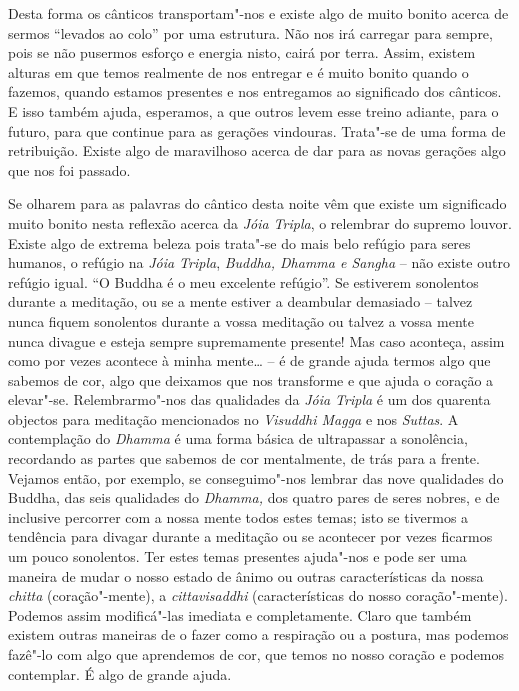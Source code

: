 Desta forma os cânticos transportam"-nos e existe algo de muito bonito
acerca de sermos ``levados ao colo'' por uma estrutura. Não nos irá
carregar para sempre, pois se não pusermos esforço e energia nisto,
cairá por terra. Assim, existem alturas em que temos realmente de nos
entregar e é muito bonito quando o fazemos, quando estamos presentes e
nos entregamos ao significado dos cânticos. E isso também ajuda,
esperamos, a que outros levem esse treino adiante, para o futuro, para
que continue para as gerações vindouras. Trata"-se de uma forma de
retribuição. Existe algo de maravilhoso acerca de dar para as novas
gerações algo que nos foi passado.

Se olharem para as palavras do cântico desta noite vêm que existe um
significado muito bonito nesta reflexão acerca da \emph{Jóia Tripla}, o
relembrar do supremo louvor. Existe algo de extrema beleza pois trata"-se
do mais belo refúgio para seres humanos, o refúgio na \emph{Jóia
Tripla}, \emph{Buddha, Dhamma e Sangha} -- não existe outro refúgio
igual. ``O Buddha é o meu excelente refúgio''. Se estiverem sonolentos
durante a meditação, ou se a mente estiver a deambular demasiado --
talvez nunca fiquem sonolentos durante a vossa meditação ou talvez a
vossa mente nunca divague e esteja sempre supremamente presente! Mas
caso aconteça, assim como por vezes acontece à minha mente\ldots{} -- é
de grande ajuda termos algo que sabemos de cor, algo que deixamos que
nos transforme e que ajuda o coração a elevar"-se. Relembrarmo"-nos das
qualidades da \emph{Jóia Tripla} é um dos quarenta objectos para
meditação mencionados no \emph{Visuddhi Magga} e nos \emph{Suttas}. A
contemplação do \emph{Dhamma} é uma forma básica de ultrapassar a
sonolência, recordando as partes que sabemos de cor mentalmente, de trás
para a frente. Vejamos então, por exemplo, se conseguimo"-nos lembrar das
nove qualidades do Buddha, das seis qualidades do \emph{Dhamma,} dos
quatro pares de seres nobres, e de inclusive percorrer com a nossa mente
todos estes temas; isto se tivermos a tendência para divagar durante a
meditação ou se acontecer por vezes ficarmos um pouco sonolentos. Ter
estes temas presentes ajuda"-nos e pode ser uma maneira de mudar o nosso
estado de ânimo ou outras características da nossa \emph{chitta}
(coração"-mente), a \emph{cittavisaddhi} (características do nosso
coração"-mente). Podemos assim modificá"-las imediata e completamente.
Claro que também existem outras maneiras de o fazer como a respiração ou
a postura, mas podemos fazê"-lo com algo que aprendemos de cor, que temos
no nosso coração e podemos contemplar. É algo de grande ajuda.

